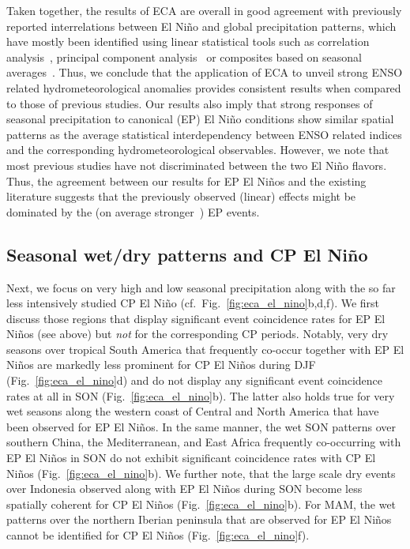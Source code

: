 \documentclass[utf8]{frontiersSCNS} %
\begin{document}
Taken together, the results of ECA are overall in good agreement with previously reported interrelations between El Ni\~no and global precipitation patterns, which have mostly been identified using linear statistical tools such as correlation analysis~\citep{Phillips1344, Camberlin2001}, principal component analysis~\citep{diaz2001} or composites based on seasonal averages~\citep{shaman2010, hoell2014}. Thus, we conclude that the application of ECA to unveil strong ENSO related hydrometeorological anomalies provides consistent results when compared to those of previous studies. Our results also imply that strong responses of seasonal precipitation to canonical (EP) El Ni\~no conditions show similar spatial patterns as the average statistical interdependency between ENSO related indices and the corresponding hydrometeorological observables. However, we note that most previous studies have not discriminated between the two El Ni\~no flavors. Thus, the agreement between our results for EP El Ni\~nos and the existing literature suggests that the previously observed (linear) effects might be dominated by the (on average stronger~\citep{kug_two_2009, huang2016ranking}) EP events.\\

\subsection{Seasonal wet/dry patterns and CP El Ni\~no}

Next, we focus on very high and low seasonal precipitation along with the so far less intensively studied CP El Ni\~no (cf.\, Fig.~\ref{fig:eca_el_nino}b,d,f). We first discuss those regions that display significant event coincidence rates for EP El Ni\~nos (see above) but \textit{not} for the corresponding CP periods. Notably, very dry seasons over tropical South America that frequently co-occur together with EP El Ni\~nos are markedly less prominent for CP El Ni\~nos during DJF (Fig.~\ref{fig:eca_el_nino}d) and do not display any significant event coincidence rates at all in SON (Fig.~\ref{fig:eca_el_nino}b). The latter also holds true for very wet seasons along the western coast of Central and North America that have been observed for EP El Ni\~nos. In the same manner, the wet SON patterns over southern China, the Mediterranean, and East Africa frequently co-occurring with EP El Ni\~nos in SON do not exhibit significant coincidence rates with CP El Ni\~nos (Fig.~\ref{fig:eca_el_nino}b). We further note, that the large scale dry events over Indonesia observed along with EP El Ni\~nos during SON become less spatially coherent for CP El Ni\~nos (Fig.~\ref{fig:eca_el_nino}b). For MAM, the wet patterns over the northern Iberian peninsula that are observed for EP El Ni\~nos cannot be identified for CP El Ni\~nos (Fig.~\ref{fig:eca_el_nino}f). 
\end{document}

